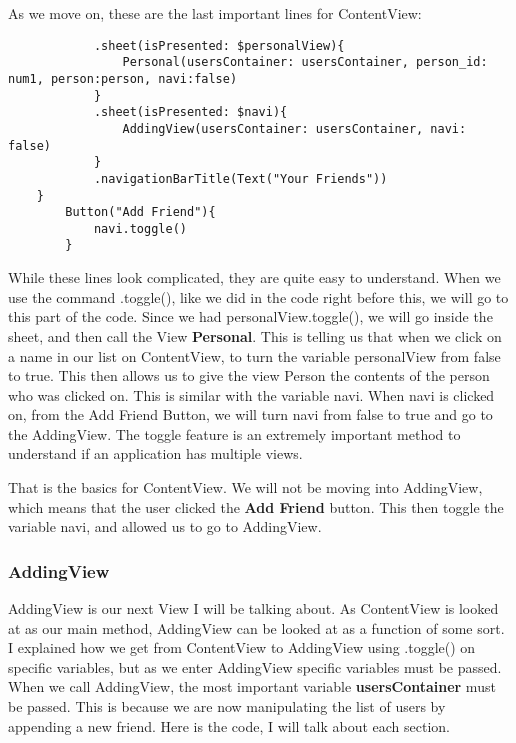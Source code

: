 \documentclass{article}
\theoremstyle{theorem}
\theoremstyle{definition}
\theoremstyle{remark}
\begin{document}
\noindent\newline As we move on, these are the last important lines for ContentView:
\begin{verbatim}
            .sheet(isPresented: $personalView){
                Personal(usersContainer: usersContainer, person_id: num1, person:person, navi:false)
            }
            .sheet(isPresented: $navi){
                AddingView(usersContainer: usersContainer, navi: false)
            }
            .navigationBarTitle(Text("Your Friends"))
    }
        Button("Add Friend"){
            navi.toggle()
        }
\end{verbatim}   
\noindent\newline While these lines look complicated, they are quite easy to understand. When we use the command .toggle(), like we did in the code right before this, we will go to this part of the code. Since we had personalView.toggle(), we will go inside the sheet, and then call the View \textbf{Personal}. This is telling us that when we click on a name in our list on ContentView, to turn the variable personalView from false to true. This then allows us to give the view Person the contents of the person who was clicked on. This is similar with the variable navi. When navi is clicked on, from the Add Friend Button, we will turn navi from false to true and go to the AddingView. The toggle feature is an extremely important method to understand if an application has multiple views.

\noindent\newline That is the basics for ContentView. We will not be moving into AddingView, which means that the user clicked the \textbf{Add Friend} button. This then toggle the variable navi, and allowed us to go to AddingView.

\subsubsection{AddingView}

AddingView is our next View I will be talking about. As ContentView is looked at as our main method, AddingView can be looked at as a function of some sort. I explained how we get from ContentView to AddingView using .toggle() on specific variables, but as we enter AddingView specific variables must be passed. When we call AddingView, the most important variable \textbf{usersContainer} must be passed. This is because we are now manipulating the list of users by appending a new friend. Here is the code, I will talk about each section.
\end{document}
